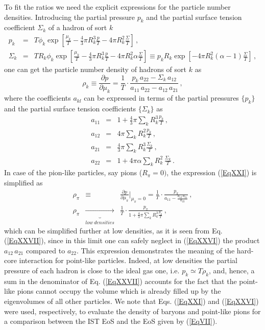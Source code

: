 \documentclass[12pt]{article}
\begin{document}
To fit the ratios we need the explicit expressions for the particle number densities. 
Introducing the partial pressure $p_k$ and the partial surface tension coefficient $\Sigma_k$ of a hadron of sort  $k$
%
\begin{eqnarray}
\label{EqXIX}
p_k &=& T \phi_k \exp \left[ \frac{\mu_k}{T} - \frac{4}{3}\pi R_k^3 \frac{p}{T} - 4\pi R_k^2 \frac{\Sigma}{T} \right]
\,, \\
%
\label{EqXX}
\Sigma_k &=& T  R_k \phi_k \exp \left[ \frac{\mu_k}{T} - \frac{4}{3}\pi R_k^3 \frac{p}{T} - 4\pi R_k^2 \alpha \frac{\Sigma}{T} \right]  \equiv  p_k R_k  \exp\left[ - 4\pi R_k^2  (\alpha -1) \frac{\Sigma}{T}   \right] \,,
%
\end{eqnarray}
%
one can get the  particle number  density of hadrons of sort $k$ as
%
\begin{equation}\label{EqXXI}
\rho_k \equiv \frac{\partial  p}{\partial \mu_k} = \frac{1}{T} \cdot \frac{p_k \, a_{22} - \Sigma_k \, a_{12}}{a_{11}\, a_{22} - a_{12}\, a_{21} } \,,
\end{equation}
%
where the coefficients $a_{kl}$ can be expressed in terms of  the partial pressures $\{ p_k\}$ and the partial surface tension coefficients $\{\Sigma_k\}$ as
\begin{eqnarray}
a_{11} &=& 1 + \frac{4}{3} \pi \sum_k  R_k^3 \frac{p_k}{T} \,, \\
a_{12} &=& 4 \pi \sum_k R_k^2 \frac{p_k}{T} \, , \\
a_{21} &=& \frac{4}{3} \pi \sum_k R_k^3\frac{\Sigma_k}{T} \, ,\\
a_{22} &=& 1 + 4 \pi  \alpha \sum_k  R_k^2 \, \frac{\Sigma_k}{T} \,.
\end{eqnarray}
%
In case of  the pion-like particles, say pions ($R_\pi = 0)$,  the expression  (\ref{EqXXI}) is simplified as 
%
%
\begin{eqnarray}\label{EqXXVI}
\rho_\pi & \equiv & \frac{\partial  p}{\partial \mu_\pi} \Biggl|_{\mu_\pi = 0} =  \frac{1}{T} \cdot \frac{p_\pi }{a_{11} - \frac{a_{12}\, a_{21}}{a_{22}} }  \,, \\
%
\rho_\pi  & \underbrace{\longrightarrow}_{low~densities} &  \frac{1}{T} \cdot \frac{p_\pi }{1 +  \frac{4}{3} \pi \sum_k  R_k^3 \frac{p_k}{T}}  \,,
\label{EqXXVII}
\end{eqnarray}
%
which can be  simplified further at low densities, as it is seen  from Eq. (\ref{EqXXVII}), since in this limit  one can  safely 
neglect  in (\ref{EqXXVI})   the product $a_{12}\, a_{21}$  compared to $a_{22}$.
This expression demonstrates the meaning of the hard-core interaction for point-like particles. Indeed, at low densities   the partial  pressure of  each hadron  is close to the ideal gas one, i.e. $p_k \simeq T \rho_k$,  and, hence,  a sum in  the  denominator of  Eq. (\ref{EqXXVII}) accounts  for the fact that the point-like pions cannot occupy the volume which is already filled up by the eigenvolumes of all other particles.  We note that Eqs. (\ref{EqXXI}) and  (\ref{EqXXVI}) were used, respectively,   to evaluate the density of baryons and  point-like pions for a comparison  between the IST EoS and  the EoS given by  (\ref{EqVII}).  
\end{document}
